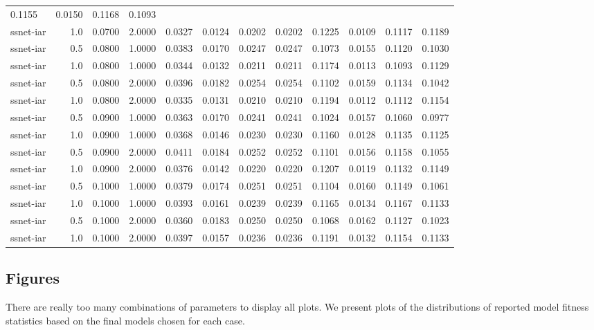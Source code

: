 \documentclass[
]{article}
\begin{document}
\begin{longtable}[]{@{}lrrrrrrrrrrr@{}}
0.1155 & 0.0150 & 0.1168 & 0.1093 \\
ssnet-iar & 1.0 & 0.0700 & 2.0000 & 0.0327 & 0.0124 & 0.0202 & 0.0202 &
0.1225 & 0.0109 & 0.1117 & 0.1189 \\
ssnet-iar & 0.5 & 0.0800 & 1.0000 & 0.0383 & 0.0170 & 0.0247 & 0.0247 &
0.1073 & 0.0155 & 0.1120 & 0.1030 \\
ssnet-iar & 1.0 & 0.0800 & 1.0000 & 0.0344 & 0.0132 & 0.0211 & 0.0211 &
0.1174 & 0.0113 & 0.1093 & 0.1129 \\
ssnet-iar & 0.5 & 0.0800 & 2.0000 & 0.0396 & 0.0182 & 0.0254 & 0.0254 &
0.1102 & 0.0159 & 0.1134 & 0.1042 \\
ssnet-iar & 1.0 & 0.0800 & 2.0000 & 0.0335 & 0.0131 & 0.0210 & 0.0210 &
0.1194 & 0.0112 & 0.1112 & 0.1154 \\
ssnet-iar & 0.5 & 0.0900 & 1.0000 & 0.0363 & 0.0170 & 0.0241 & 0.0241 &
0.1024 & 0.0157 & 0.1060 & 0.0977 \\
ssnet-iar & 1.0 & 0.0900 & 1.0000 & 0.0368 & 0.0146 & 0.0230 & 0.0230 &
0.1160 & 0.0128 & 0.1135 & 0.1125 \\
ssnet-iar & 0.5 & 0.0900 & 2.0000 & 0.0411 & 0.0184 & 0.0252 & 0.0252 &
0.1101 & 0.0156 & 0.1158 & 0.1055 \\
ssnet-iar & 1.0 & 0.0900 & 2.0000 & 0.0376 & 0.0142 & 0.0220 & 0.0220 &
0.1207 & 0.0119 & 0.1132 & 0.1149 \\
ssnet-iar & 0.5 & 0.1000 & 1.0000 & 0.0379 & 0.0174 & 0.0251 & 0.0251 &
0.1104 & 0.0160 & 0.1149 & 0.1061 \\
ssnet-iar & 1.0 & 0.1000 & 1.0000 & 0.0393 & 0.0161 & 0.0239 & 0.0239 &
0.1165 & 0.0134 & 0.1167 & 0.1133 \\
ssnet-iar & 0.5 & 0.1000 & 2.0000 & 0.0360 & 0.0183 & 0.0250 & 0.0250 &
0.1068 & 0.0162 & 0.1127 & 0.1023 \\
ssnet-iar & 1.0 & 0.1000 & 2.0000 & 0.0397 & 0.0157 & 0.0236 & 0.0236 &
0.1191 & 0.0132 & 0.1154 & 0.1133 \\
\bottomrule
\end{longtable}

\hypertarget{figures}{%
\subsection{Figures}\label{figures}}

There are really too many combinations of parameters to display all
plots. We present plots of the distributions of reported model fitness
statistics based on the final models chosen for each case.
\end{document}
